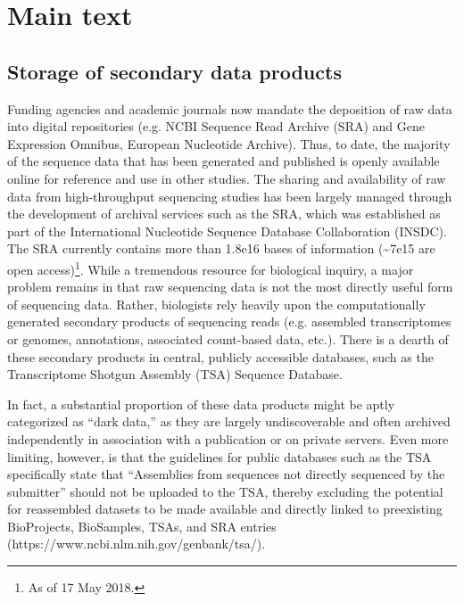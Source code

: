 \documentclass[a4paper,num-refs]{oup-contemporary}
\begin{document}
\section{Main text}
\subsection{Storage of secondary data products}
Funding agencies and academic journals now mandate the deposition of raw data into digital repositories (e.g. NCBI Sequence Read Archive (SRA) and Gene Expression Omnibus, European Nucleotide Archive). Thus, to date, the majority of the sequence data that has been generated and published is openly available online for reference and use in other studies. The sharing and availability of raw data from high-throughput sequencing studies has been largely managed through the development of archival services such as the SRA, which was established as part of the International Nucleotide Sequence Database Collaboration (INSDC)\cite{Kodama2012, Shumway2009}. The SRA currently contains more than 1.8e16 bases of information (\textasciitilde7e15 are open access)\footnote{As of 17 May 2018.}. While a tremendous resource for biological inquiry, a major problem remains in that raw sequencing data is not the most directly useful form of sequencing data. Rather, biologists rely heavily upon the computationally generated secondary products of sequencing reads (e.g. assembled transcriptomes or genomes, annotations, associated count-based data, etc.). There is a dearth of these secondary products in central, publicly accessible databases, such as the  Transcriptome Shotgun Assembly (TSA) Sequence Database.

In fact, a substantial proportion of these data products might be aptly categorized as ``dark data,'' as they are largely undiscoverable and often archived independently in association with a publication or on private servers. Even more limiting, however, is that the guidelines for public databases such as the TSA specifically state that ``Assemblies from sequences not directly sequenced by the submitter'' should not be uploaded to the TSA, thereby excluding the potential for reassembled datasets to be made available and directly linked to preexisting BioProjects, BioSamples, TSAs, and SRA entries (https://www.ncbi.nlm.nih.gov/genbank/tsa/).
\end{document}
